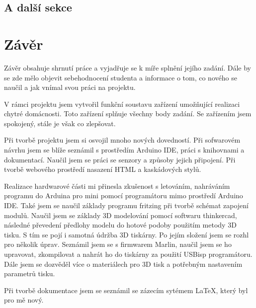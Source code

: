 \documentclass[11pt,a4paper,twoside,openright]{report}
\let\openright=\cleardoublepage
\begin{document}
\section{A další sekce}


\chapter*{Závěr}
\pagestyle{empty}


Závěr obsahuje shrnutí práce a vyjadřuje se k míře splnění jejího zadání. Dále by se zde mělo objevit sebehodnocení studenta a informace o tom, co nového se naučil a jak vnímal svou práci na projektu.

V rámci projektu jsem vytvořil funkční soustavu zařízení umožňující realizaci chytré domácnosti. Toto zařízení splňuje všechny body zadání. Se zařízením jsem spokojený, stále je však co zlepšovat.


Při tvorbě projektu jsem si osvojil mnoho nových dovedností. Při sofwarovém návrhu jsem se blíže seznámil s prostředím Arduino IDE, práci s knihovnami a dokumentací. Naučil jsem se práci se senzory a způsoby jejich připojení. Při tvorbě webového prostředí nasazení HTML a kaskádových stylů.


Realizace hardwarové části mi přinesla zkušenost s letováním, nahráváním programu do Arduina pro mini pomocí programátoru mimo prostředí Arduino IDE. Také jsem se naučil základy programu fritzing při tvorbě schémat zapojení modulů. Naučil jsem se základy 3D modelování pomocí softwaru thinkercad, následné převedení předlohy modelu do hotové podoby použitím metody 3D tisku. S tím se pojí i samotná údržba 3D tiskárny. Po jejím složení jsem se rozhl pro několik úprav. Seznámil jsem se s firmwarem Marlin, naučil jsem se ho upravovat, zkompilovat a nahrát ho do tiskárny za použití USBisp programátoru. Dále jsem se dozvěděl více o materiálech pro 3D tisk a potřebným nastavením parametrů tisku.


Při tvorbě dokumentace jsem se seznámil se zázecím sytémem \LaTeX, který byl pro mě nový. 

\nocite{einstein}\nocite{maly}\nocite{knuthwebsite}\nocite{ucebnice}\nocite{polovodicovatechnika}\nocite{šrait}\nocite{techtutorials}
\printbibliography[title={Seznam použité literatury},heading={bibintoc}]

\openright
\listoffigures
{}

\clearpage
\listoftables
{}


\end{document}
